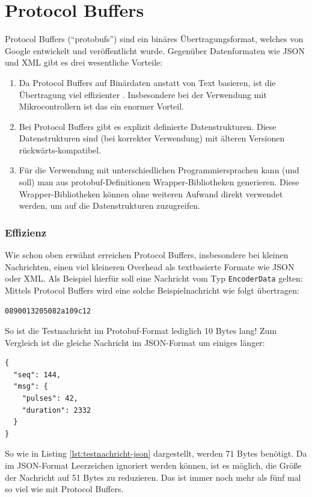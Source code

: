 \section{Protocol Buffers}
\label{subsec:ueberblick_protobufs}
Protocol Buffers \cite{protobufs} (``protobufs'') sind ein binäres Übertragungsformat,
welches von Google entwickelt und veröffentlicht wurde.
%
Gegenüber Datenformaten wie JSON und XML gibt es drei wesentliche Vorteile:
\begin{enumerate}
    \item Da Protocol Buffers auf Binärdaten anstatt von Text basieren,
    ist die Übertragung viel effizienter \cite{7765670}.
    Insbesondere bei der Verwendung mit Mikrocontrollern ist das ein enormer Vorteil.

    \item Bei Protocol Buffers gibt es explizit definierte Datenstrukturen.
    Diese Datenstrukturen sind (bei korrekter Verwendung) mit älteren Versionen rückwärts-kompatibel.

    \item Für die Verwendung mit unterschiedlichen Programmiersprachen kann (und soll) man aus protobuf-Definitionen
    Wrapper-Bibliotheken generieren.
    Diese Wrapper-Bibliotheken können ohne weiteren Aufwand direkt verwendet werden,
    um auf die Datenstrukturen zuzugreifen.
\end{enumerate}

\subsubsection{Effizienz}
Wie schon oben erwähnt erreichen Protocol Buffers,
insbesondere bei kleinen Nachrichten,
einen viel kleineren Overhead als textbasierte Formate wie JSON oder XML.
%
Als Beispiel hierfür soll eine Nachricht vom Typ \texttt{EncoderData} gelten:
%
Mittels Protocol Buffers wird eine solche Beispielnachricht wie folgt übertragen:
%
\begin{lstlisting}[label=lst:testnachricht-proto,caption=Testnachricht (Protobuf) in Hexadezimaldarstellung]
    0890013205082a109c12
\end{lstlisting}
So ist die Testnachricht im Protobuf-Format lediglich 10 Bytes lang!
%
Zum Vergleich ist die gleiche Nachricht im JSON-Format um einiges länger:
\begin{lstlisting}[label=lst:testnachricht-json,caption=Testnachricht (JSON) als formattierter String]
{
  "seq": 144,
  "msg": {
    "pulses": 42,
    "duration": 2332
  }
}
\end{lstlisting}
So wie in Listing \ref{lst:testnachricht-json} dargestellt,
werden 71 Bytes benötigt.
%
Da im JSON-Format Leerzeichen ignoriert werden können,
ist es möglich, die Größe der Nachricht auf 51 Bytes zu reduzieren.
%
Das ist immer noch mehr als fünf mal so viel wie mit Protocol Buffers.

